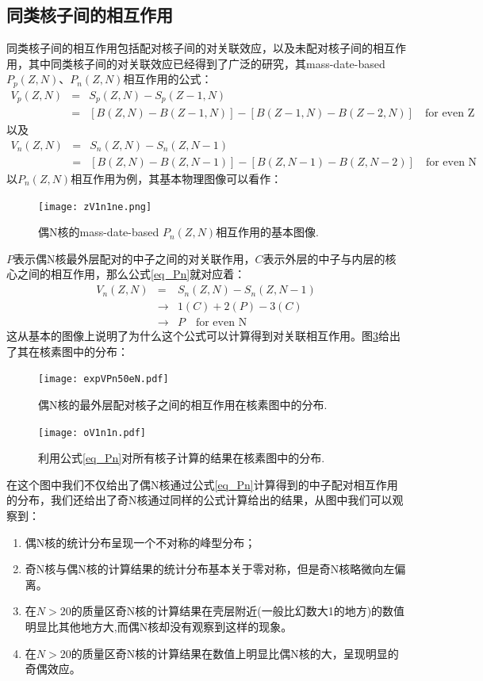 \subsection{同类核子间的相互作用}
同类核子间的相互作用包括配对核子间的对关联效应，以及未配对核子间的相互作用，其中同类核子间的对关联效应已经得到了广泛的研究，其mass-date-based $P_p(Z,N)$、$P_n(Z,N)$相互作用的公式\cite{RN560}：
\begin{eqnarray}
  V_p(Z,N)&=&S_p(Z,N)-S_p(Z-1,N)\\
  &=&[B(Z,N)-B(Z-1,N)]-[B(Z-1,N)-B(Z-2,N)]\quad \textrm{for even Z}\nonumber
\end{eqnarray}
以及
\begin{eqnarray}\label{eq_Pn}
  V_n(Z,N)&=&S_n(Z,N)-S_n(Z,N-1)\\
  &=&[B(Z,N)-B(Z,N-1)]-[B(Z,N-1)-B(Z,N-2)]\quad \textrm{for even N}\nonumber
\end{eqnarray}
以$P_n(Z,N)$相互作用为例，其基本物理图像可以看作：
\begin{figure}[H]
\centering
\texttt{[image: zV1n1ne.png]}
\caption{偶N核的mass-date-based $P_n(Z,N)$相互作用的基本图像.\label{fig_zV1n1ne}}
\end{figure}
$P$表示偶N核最外层配对的中子之间的对关联作用，$C$表示外层的中子与内层的核心之间的相互作用，那么公式\ref{eq_Pn}就对应着：
\begin{eqnarray}
  V_n(Z,N)&=&S_n(Z,N)-S_n(Z,N-1)\\ \nonumber
  &\to&1(C)+2(P)-3(C)\\ \nonumber
  &\to&P\quad \textrm{for even N}\nonumber
\end{eqnarray}
这从基本的图像上说明了为什么这个公式可以计算得到对关联相互作用。图\ref{fig_oV1n1n}给出了其在核素图中的分布：
\begin{figure}[H]
\centering
\texttt{[image: expVPn50eN.pdf]}
\caption{偶N核的最外层配对核子之间的相互作用在核素图中的分布.\label{fig_expVPn50eN}}
\end{figure}
\begin{figure}[H]
\centering
\texttt{[image: oV1n1n.pdf]}
\caption{利用公式\ref{eq_Pn}对所有核子计算的结果在核素图中的分布.\label{fig_oV1n1n}}
\end{figure}
在这个图中我们不仅给出了偶N核通过公式\ref{eq_Pn}计算得到的中子配对相互作用的分布，我们还给出了奇N核通过同样的公式计算给出的结果，从图中我们可以观察到：
\begin{enumerate}
  \item 偶N核的统计分布呈现一个不对称的峰型分布；
  \item 奇N核与偶N核的计算结果的统计分布基本关于零对称，但是奇N核略微向左偏离。
  \item 在$N>20$的质量区奇N核的计算结果在壳层附近(一般比幻数大1的地方)的数值明显比其他地方大,而偶N核却没有观察到这样的现象。
  \item 在$N>20$的质量区奇N核的计算结果在数值上明显比偶N核的大，呈现明显的奇偶效应。
\end{enumerate}

